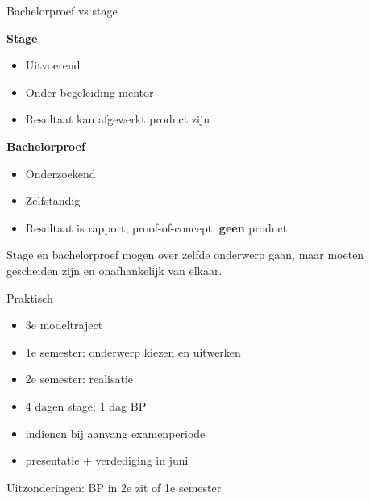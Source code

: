 \documentclass[aspectratio=169]{beamer}
\begin{document}
\begin{frame}{Bachelorproef vs stage}
  
  \begin{multicols}{2}
    \textbf{Stage}
    
    \begin{itemize}
      \item Uitvoerend
      \item Onder begeleiding mentor
      \item Resultaat kan afgewerkt product zijn
    \end{itemize}
    
    \columnbreak
    
    \textbf{Bachelorproef}
    
    \begin{itemize}
      \item Onderzoekend
      \item Zelfstandig
      \item Resultaat is rapport, proof-of-concept, \textbf{geen} product
    \end{itemize}
  \end{multicols}
  
  Stage en bachelorproef mogen over zelfde onderwerp gaan, maar moeten gescheiden zijn en onafhankelijk van elkaar.
  
\end{frame}

\begin{frame}{Praktisch}
  
  \begin{itemize}
    \item 3e modeltraject
    \item 1e semester: onderwerp kiezen en uitwerken
    \item 2e semester: realisatie
    \item 4 dagen stage; 1 dag BP
    \item indienen bij aanvang examenperiode
    \item presentatie + verdediging in juni
  \end{itemize}
  
  Uitzonderingen: BP in 2e zit of 1e semester
\end{frame}
\end{document}
